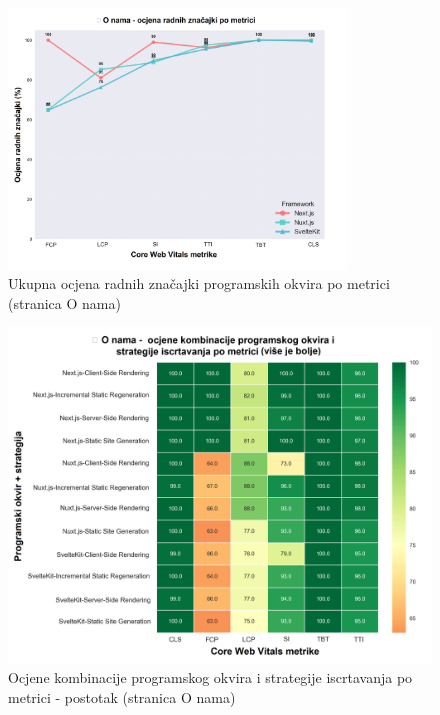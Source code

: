 \begin{figure}[H]
    \centering
    \includegraphics[width=0.8\textwidth]{slike/rezultati/about/about_performance_by_metric.png}
    \caption{Ukupna ocjena radnih značajki programskih okvira po metrici (stranica O nama)}
    \label{fig:testiranje-o-nama-performanse-po-metrici}
\end{figure}

\begin{figure}[H]
    \centering
    \includegraphics[width=\textwidth]{slike/rezultati/about/about_performance_scores.png}
    \caption{Ocjene kombinacije programskog okvira i strategije iscrtavanja po metrici - postotak (stranica O nama)}
    \label{fig:testiranje-o-nama-postotak}
\end{figure}

